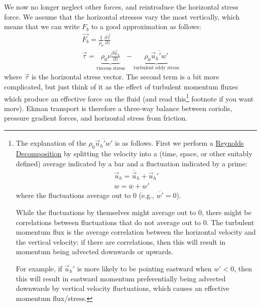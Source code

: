 We now no longer neglect other forces, and reintroduce the horizontal stress force. We assume that the horizontal stresses vary the most vertically, which means that we can write \(F_b\) to a good approximation as follows:
\begin{gather*}
    \vec{F_b} = \frac{1}{\rho_0}\frac{\partial \vec{\tau}}{\partial z}\\
    \vec{\tau}=\underbrace{\rho_0\nu\frac{\partial \vec{u}_h}{\partial z}}_{\text{viscous stress}}-
    \underbrace{\rho_0 \overline{\vec{u}_h'w'}}_{\text{turbulent eddy stress}}
\end{gather*}
where \(\vec{\tau}\) is the horizontal stress vector. The second term is a bit more complicated, but just think of it as the effect of turbulent momentum fluxes which produce an effective force on the fluid (and read this\footnote{
    The explanation of the \(\rho_0 \overline{\vec{u}_h'w'}\) is as follows. First we perform a \href{https://en.wikipedia.org/wiki/Reynolds_decomposition}{Reynolds Decomposition} by splitting the velocity into a (time, space, or other suitably defined) average indicated by a bar and a fluctuation indicated by a prime:
    \begin{align*}
        \vec{u}_h = \overline{\vec{u}}_h+\vec{u}_h'
        \\
        w = \overline{w}+w'
    \end{align*}
    where the fluctuations average out to \(0\) (e.g., \(\overline{w'}=0\)).

    While the fluctuations by themselves might average out to \(0\), there might be correlations between fluctuations that do not average out to \(0\). The turbulent momentum flux is the average correlation between the horizontal velocity and the vertical velocity: if there are correlations, then this will result in momentum being advected downwards or upwards. 
    
    For example, if \(\vec{u}_h'\) is more likely to be pointing eastward when \(w'<0\), then this will result in eastward momentum preferentially being advected downwards by vertical velocity fluctuations, which causes an effective momentum flux/stress.
} footnote if you want more). Ekman transport is therefore a three-way balance between coriolis, pressure gradient forces, and horizontal stress from friction.

